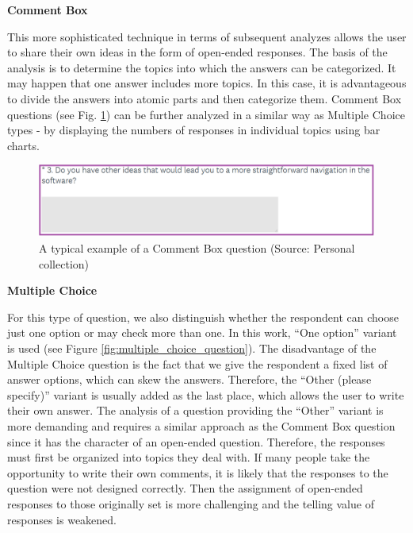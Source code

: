 \documentclass[a4paper,10pt,twoside]{article}
\begin{document}
\smallskip
\vspace*{-0.5cm}
\noindent \textbf {Comment Box}

\noindent This more sophisticated technique in terms of subsequent analyzes allows the user to share their own ideas in the form of open-ended responses. The basis of the analysis is to determine the topics into which the answers can be categorized. It may happen that one answer includes more topics. In this case, it is advantageous to divide the answers into atomic parts and then categorize them. Comment Box questions (see Fig. \ref{fig:comment_box_question}) can be further analyzed in a similar way as Multiple Choice types - by displaying the numbers of responses in individual topics using bar charts.

\vspace{0.3cm}
\begin{figure}[hbt!] 
\begin{center}
\includegraphics[width=15cm]{../pictures/comment_box_question.png} 
\caption[A typical example of a Comment Box question]{A typical example of a Comment Box question (Source: Personal collection)}
\label{fig:comment_box_question}
\end{center}
\end{figure}

\smallskip
\vspace*{-0.5cm}
\noindent \textbf {Multiple Choice}

\noindent For this type of question, we also distinguish whether the respondent can choose just one option or may check more than one. In this work, ``One option'' variant is used (see Figure \ref{fig:multiple_choice_question}). The disadvantage of the Multiple Choice question is the fact that we give the respondent a fixed list of answer options, which can skew the answers. Therefore, the ``Other (please specify)'' variant is usually added as the last place, which allows the user to write their own answer. The analysis of a question providing the ``Other'' variant is more demanding and requires a similar approach as the Comment Box question since it has the character of an open-ended question. Therefore, the responses must first be organized into topics they deal with. If many people take the opportunity to write their own comments, it is likely that the responses to the question were not designed correctly. Then the assignment of open-ended responses to those originally set is more challenging and the telling value of responses is weakened.
\end{document}
